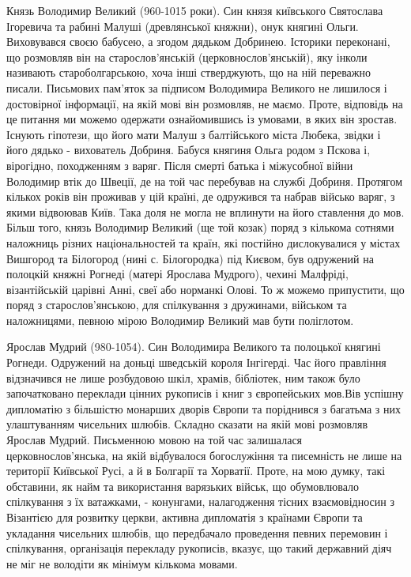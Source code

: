 Князь Володимир Великий (960-1015 роки). Син князя київського Святослава
Ігоревича та рабині Малуші (древлянської княжни), онук княгині Ольги.
Виховувався своєю бабусею, а згодом дядьком Добринею. Історики переконані, що
розмовляв він на старослов’янській (церковнослов’янській), яку інколи називають
староболгарською, хоча інші стверджують, що на ній переважно  писали. Письмових
пам’яток за підписом Володимира Великого не лишилося і достовірної інформації,
на якій мові він розмовляв, не маємо. Проте, відповідь на це питання ми можемо
одержати ознайомившись із умовами, в яких він зростав. Існують гіпотези, що
його мати Малуш з балтійського міста Любека, звідки і його дядько - вихователь
Добриня. Бабуся княгиня Ольга родом з Пскова і, вірогідно, походженням з варяг.
Після смерті батька і міжусобної війни Володимир втік до Швеції, де на той час
перебував на службі Добриня. Протягом кількох років він проживав у цій країні,
де одружився та набрав військо варяг, з якими відвоював Київ. Така доля не
могла не вплинути на його ставлення до мов. Більш того, князь Володимир Великий
(ще той козак) поряд з кількома сотнями наложниць різних національностей та
країн, які постійно дислокувалися у містах Вишгород та Білогород (нині с.
Білогородка) під Києвом, був одружений на полоцкій княжні Рогнеді (матері
Ярослава Мудрого), чехині Малфріді, візантійській царівні Анні, свеї або
норманкі Олові. То ж можемо припустити, що поряд з старослов’янською, для
спілкування з дружинами, військом та наложницями, певною мірою Володимир
Великий мав бути поліглотом.

Ярослав Мудрий (980-1054). Син Володимира Великого та полоцької княгині
Рогнеди. Одружений на доньці шведській короля Інгігерді. Час його правління
відзначився не лише розбудовою шкіл, храмів, бібліотек, ним також було
започатковано переклади цінних рукописів і книг з європейських мов.Вів успішну
дипломатію з більшістю монарших дворів Європи та поріднився з багатьма з них
улаштуванням чисельних шлюбів. Складно сказати на якій мові розмовляв Ярослав
Мудрий. Письменною мовою на той час залишалася церковнослов’янська, на якій
відбувалося богослужіння та писемність не лише на території Київської Русі, а й
в Болгарії та Хорватії. Проте, на мою думку, такі обставини, як найм та
використання варязьких військ, що обумовлювало спілкування з їх ватажками, -
конунгами, налагодження тісних взаємовідносин з Візантією для розвитку церкви,
активна дипломатія з країнами Європи та укладання чисельних шлюбів, що
передбачало проведення певних перемовин і спілкування, організація перекладу
рукописів, вказує, що такий державний діяч не міг не володіти як мінімум
кількома мовами.

